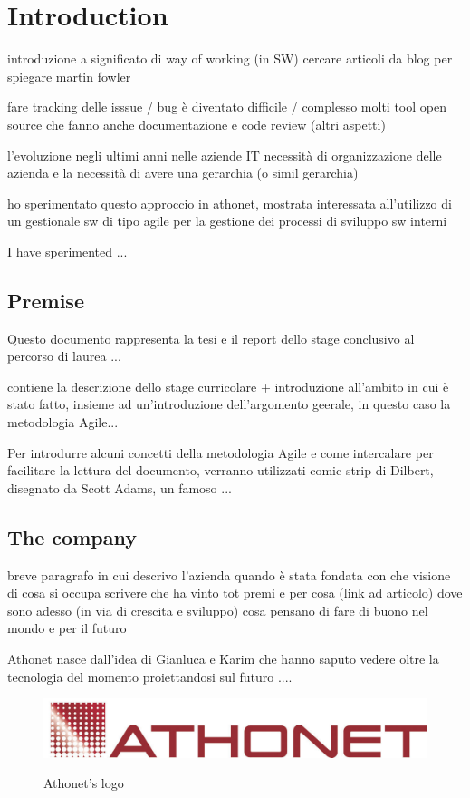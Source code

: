 \chapter{Introduction}
\label{introduction}

introduzione a significato di way of working (in SW)
	cercare articoli da blog per spiegare
	martin fowler		

fare tracking delle isssue / bug è diventato difficile / complesso
	molti tool open source che fanno anche documentazione e code review (altri aspetti)

l'evoluzione negli ultimi anni nelle aziende IT
	necessità di organizzazione delle azienda e la necessità di avere una gerarchia (o simil gerarchia)

ho sperimentato questo approccio in athonet, mostrata interessata all'utilizzo di un gestionale sw di tipo agile per la gestione dei processi di sviluppo sw interni

I have sperimented ... 

\section{Premise}

	Questo documento rappresenta la tesi e il report dello stage conclusivo al percorso di laurea ...
	
	contiene la descrizione dello stage curricolare + introduzione all'ambito in cui è stato fatto, insieme ad un'introduzione dell'argomento geerale, in questo caso la metodologia Agile...

	Per introdurre alcuni concetti della metodologia Agile e come intercalare per facilitare la lettura del documento, verranno utilizzati comic strip di Dilbert, disegnato da Scott Adams, un famoso ...
	
\section{The company}
	breve paragrafo in cui descrivo l'azienda
	quando è stata fondata
	con che visione
	di cosa si occupa
	scrivere che ha vinto tot premi e per cosa (link ad articolo)
	dove sono adesso (in via di crescita e sviluppo)
	cosa pensano di fare di buono nel mondo e per il futuro
	
	Athonet nasce dall'idea di Gianluca e Karim che hanno saputo vedere oltre la tecnologia del momento proiettandosi sul futuro ....
	
	\begin{figure}[H]
		\centering
		\includegraphics[width=.7\textwidth]{resources/ath_logo}\\
		\caption{Athonet's logo}
	\end{figure}
		


